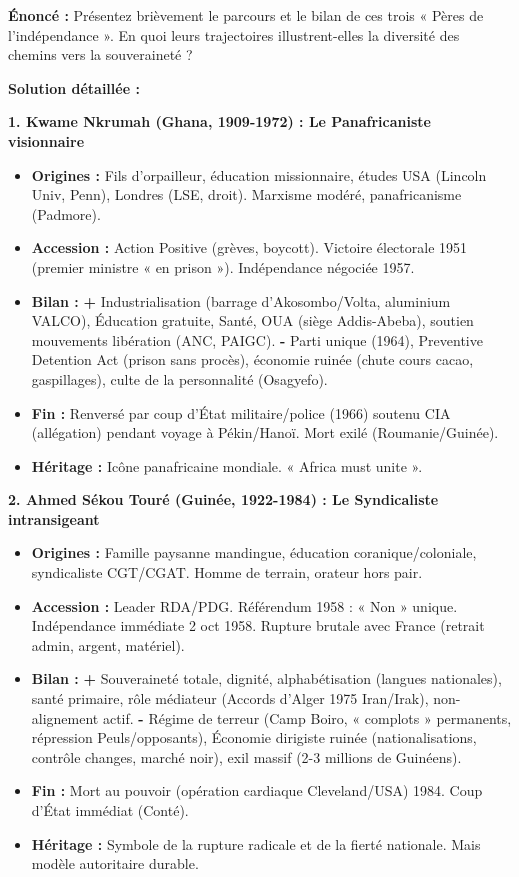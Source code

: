 \documentclass[11pt]{article}
\newcommand{\cle}[1]{{\popxbold\color{popdark}#1}}
\begin{document}
\begin{exoresolu}
\textbf{Énoncé :} Présentez brièvement le parcours et le bilan de ces trois « Pères de l'indépendance ». En quoi leurs trajectoires illustrent-elles la diversité des chemins vers la souveraineté ?

\tcblower
\textbf{Solution détaillée :}

\textbf{1. Kwame Nkrumah (Ghana, 1909-1972) : Le Panafricaniste visionnaire}
\begin{itemize}
    \item \textbf{Origines :} Fils d'orpailleur, éducation missionnaire, études USA (Lincoln Univ, Penn), Londres (LSE, droit). Marxisme modéré, panafricanisme (Padmore).
    \item \textbf{Accession :} \cle{Action Positive} (grèves, boycott). Victoire électorale 1951 (premier ministre « en prison »). Indépendance négociée 1957.
    \item \textbf{Bilan :} \textbf{+} Industrialisation (barrage d'Akosombo/Volta, aluminium VALCO), Éducation gratuite, Santé, \cle{OUA} (siège Addis-Abeba), soutien mouvements libération (ANC, PAIGC). \textbf{-} \cle{Parti unique} (1964), \cle{Preventive Detention Act} (prison sans procès), économie ruinée (chute cours cacao, gaspillages), culte de la personnalité (\cle{Osagyefo}).
    \item \textbf{Fin :} Renversé par coup d'État militaire/police (1966) soutenu CIA (allégation) pendant voyage à Pékin/Hanoï. Mort exilé (Roumanie/Guinée).
    \item \textbf{Héritage :} Icône panafricaine mondiale. « Africa must unite ».
\end{itemize}

\textbf{2. Ahmed Sékou Touré (Guinée, 1922-1984) : Le Syndicaliste intransigeant}
\begin{itemize}
    \item \textbf{Origines :} Famille paysanne mandingue, éducation coranique/coloniale, syndicaliste CGT/CGAT. Homme de terrain, orateur hors pair.
    \item \textbf{Accession :} Leader RDA/PDG. \cle{Référendum 1958 : « Non » unique}. Indépendance immédiate 2 oct 1958. Rupture brutale avec France (retrait admin, argent, matériel).
    \item \textbf{Bilan :} \textbf{+} Souveraineté totale, dignité, alphabétisation (langues nationales), santé primaire, rôle médiateur (Accords d'Alger 1975 Iran/Irak), non-alignement actif. \textbf{-} \cle{Régime de terreur} (Camp Boiro, « complots » permanents, répression Peuls/opposants), \cle{Économie dirigiste} ruinée (nationalisations, contrôle changes, marché noir), exil massif (2-3 millions de Guinéens).
    \item \textbf{Fin :} Mort au pouvoir (opération cardiaque Cleveland/USA) 1984. Coup d'État immédiat (Conté).
    \item \textbf{Héritage :} Symbole de la \cle{rupture radicale} et de la \cle{fierté nationale}. Mais modèle autoritaire durable.
\end{itemize}


\end{exoresolu}
\end{document}
